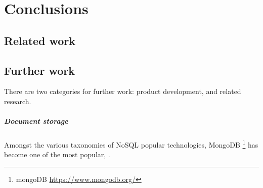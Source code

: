 \chapter{Conclusions}\label{chap:conclusions}








\cite{cummins2014pip-db}
\cite{cummins2014migrating}

\section*{Related work}\label{sec:related-work}


\section*{Further work}\label{sec:further-work}

There are two categories for further work: product development, and
related research.



\cite{saraiya2005insight}
\cite{augustine2002discovering}

\paragraph{Document storage} Amongst the various taxonomies of NoSQL
popular technologies, MongoDB
\footnote{mongoDB \url{https://www.mongodb.org/}} has become one of the most
popular, \cite{tudorica2011comparison, mongo2014leading,
  hecht2011nosql, mongo2013top5}.






\cite{chodorow2013mongodb}

